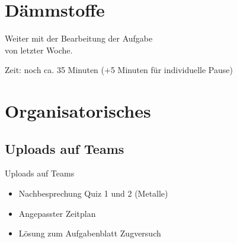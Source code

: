 \section{Dämmstoffe}
\BlueSectionSlide

\begin{frame}{Weiter mit der Bearbeitung der Aufgabe \\ von letzter Woche.}

	Zeit: noch ca. 35 Minuten (+5 Minuten für individuelle Pause)

\end{frame}




%




\section{Organisatorisches}
\BlueSectionSlide

\subsection{Uploads auf Teams}
\begin{frame}{Uploads auf Teams}
	\begin{itemize}
		\item[\textbullet] Nachbesprechung Quiz 1 und 2 (Metalle)
		\item[\textbullet] Angepasster Zeitplan
		\item[\textbullet] Lösung zum Aufgabenblatt Zugversuch 
	\end{itemize}

\end{frame}








\folieFragen
